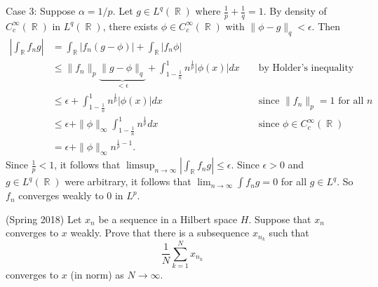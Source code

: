 \documentclass[answers]{exam}
\DeclareMathOperator{\RR}{\mathbb{R}}
\begin{document}
\begin{questions}
\begin{solution}
  Case 3: Suppose $\alpha=1/p$. Let $g\in L^{q}(\RR)$ where $\frac{1}{p}+\frac{1}{q}=1$. By density of $C_{c}^{\infty}(\RR)$ in $L^{q}(\RR)$, there exists $\phi\in C_{c}^{\infty}(\RR)$ with $\| \phi-g \|_{q}<\epsilon$. Then
  \begin{align*}
    \left|\int_{\RR}f_{n}g\right|
    &= \int_{\RR} |f_{n}(g-\phi)| + \int_{\RR} |f_{n}\phi|\\
    &\leq \| f_{n} \|_{p}\underbrace{\| g-\phi \|_{q}}_{<\epsilon} + \int_{1-\frac{1}{n}}^{1}n^{\frac{1}{p}}|\phi(x)|dx
    &&\text{ by Holder's inequality}\\
    &\leq \epsilon + \int_{1-\frac{1}{n}}^{1}n^{\frac{1}{p}}|\phi(x)|dx
    &&\text{ since }\| f_{n} \|_{p}= 1\text{ for all }n\\
    &\leq \epsilon + \| \phi \|_{\infty}\int_{1-\frac{1}{n}}^{1}n^{\frac{1}{p}}dx
    &&\text{ since }\phi\in C_{c}^{\infty}(\RR)\\
    &= \epsilon + \| \phi \|_{\infty}n^{\frac{1}{p}-1}.
  \end{align*}
  Since $\frac{1}{p}<1$, it follows that $\limsup_{n\to\infty}\left| \int_{\RR}f_{n}g\right| \leq \epsilon$. Since $\epsilon>0$ and $g\in L^{q}(\RR)$ were arbitrary, it follows that $\lim_{n\to\infty} \int f_{n}g = 0$ for all $g\in L^{q}$. So $f_{n}$ converges weakly to $0$ in $L^{p}$.
\end{solution}


\item (Spring 2018) Let $x_{n}$ be a sequence in a Hilbert space $H$. Suppose that $x_{n}$ converges to $x$ weakly. Prove that there is a subsequence $x_{n_{k}}$ such that
\begin{equation*}
  \frac{1}{N}\sum_{k=1}^{N}x_{n_{k}}
\end{equation*}
converges to $x$ (in norm) as $N\to\infty$. 


\end{questions}
\end{document}
